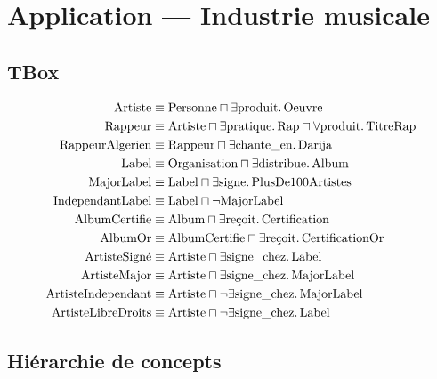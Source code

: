 \section{Application — Industrie musicale}

\subsection{TBox}

\begin{tcolorbox}[defbox, title={TBox musicale (sélection)}]
\begin{align*}
\text{Artiste}           &\equiv \text{Personne} \sqcap \exists \text{produit}.\,\text{Oeuvre} \\
\text{Rappeur}           &\equiv \text{Artiste} \sqcap \exists \text{pratique}.\,\text{Rap}
                                  \sqcap \forall \text{produit}.\,\text{TitreRap} \\
\text{RappeurAlgerien}   &\equiv \text{Rappeur} \sqcap \exists \text{chante\_en}.\,\text{Darija} \\
\text{Label}             &\equiv \text{Organisation} \sqcap \exists \text{distribue}.\,\text{Album} \\
\text{MajorLabel}        &\equiv \text{Label} \sqcap \exists \text{signe}.\,\text{PlusDe100Artistes} \\
\text{IndependantLabel}  &\equiv \text{Label} \sqcap \lnot \text{MajorLabel} \\
\text{AlbumCertifie}     &\equiv \text{Album} \sqcap \exists \text{reçoit}.\,\text{Certification} \\
\text{AlbumOr}           &\equiv \text{AlbumCertifie} \sqcap \exists \text{reçoit}.\,\text{CertificationOr} \\
\text{ArtisteSign\'{e}} &\equiv \text{Artiste} \sqcap \exists \text{signe\_chez}.\,\text{Label} \\
\text{ArtisteMajor}      &\equiv \text{Artiste} \sqcap \exists \text{signe\_chez}.\,\text{MajorLabel} \\
\text{ArtisteIndependant}&\equiv \text{Artiste} \sqcap \lnot \exists \text{signe\_chez}.\,\text{MajorLabel} \\
\text{ArtisteLibreDroits}&\equiv \text{Artiste} \sqcap \lnot \exists \text{signe\_chez}.\,\text{Label}
\end{align*}
\end{tcolorbox}

\subsection{Hiérarchie de concepts}

